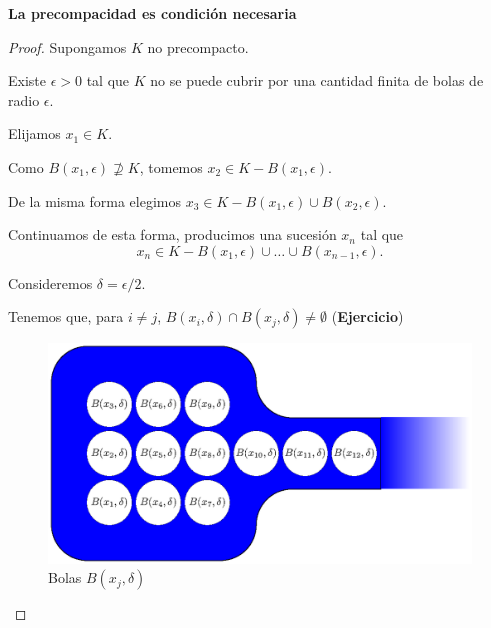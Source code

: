 \documentclass[a4,portrait]{seminar}
\newtheorem{thm}{Teorema}
\begin{document}
\begin{slide*}
\begin{center}
{\large \textbf{La precompacidad es condici\'on necesaria}}
\end{center}

\begin{proof}
\setlength{\parskip}{2\parskip}


Supongamos  $K$ no  precompacto.


Existe $\epsilon>0$ tal que $K$ no se puede cubrir por una
cantidad finita de bolas de radio $\epsilon$.

Elijamos $x_1\in K$.

Como $B(x_1,\epsilon)\nsupseteq K$, tomemos $x_2\in
K-B(x_1,\epsilon)$.


De la misma forma elegimos $x_3\in K-B(x_1,\epsilon)\cup
B(x_2,\epsilon)$.

Continuamos de esta forma, producimos una sucesi\'on $x_n$ tal que
\[
    x_n\in K-B(x_1,\epsilon)\cup\dots\cup B(x_{n-1},\epsilon).
\]

Consideremos $\delta=\epsilon/2$.

Tenemos que, para $i\neq j$, $B(x_i,\delta)\cap
B(x_j,\delta)\neq\emptyset$ (\textbf{Ejercicio})



\setlength{\unitlength}{40mm}
\begin{figure}[h]
    \includegraphics[height=1\unitlength,width=1.8314\unitlength]{figura2.eps}
\caption{Bolas $B(x_j,\delta)$}\label{bolitas}
\end{figure}



\end{proof}
\end{slide*}
\end{document}
